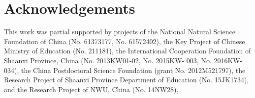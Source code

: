 \section*{Acknowledgements}
This work was partial supported by projects of the National
Natural Science Foundation of China (No. 61373177, No.
61572402), the Key Project of Chinese Ministry of Education
(No. 211181), the International Cooperation Foundation of
Shaanxi Province, China (No. 2013KW01-02, No. 2015KW-
003, No. 2016KW-034), the China Postdoctoral Science Foundation (grant No. 2012M521797), the Research Project of
Shaanxi Province Department of Education (No. 15JK1734),
and the Research Project of NWU, China (No. 14NW28),